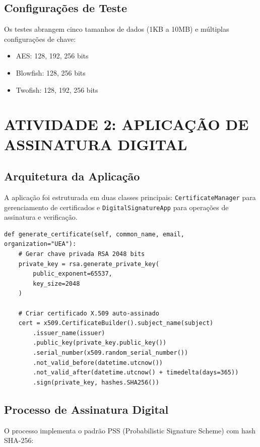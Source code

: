 \documentclass[12pt,a4paper,oneside]{article}
\begin{document}
\subsection{Configurações de Teste}

Os testes abrangem cinco tamanhos de dados (1KB a 10MB) e múltiplas configurações de chave:
\begin{itemize}
    \item AES: 128, 192, 256 bits
    \item Blowfish: 128, 256 bits
    \item Twofish: 128, 192, 256 bits
\end{itemize}

\section{ATIVIDADE 2: APLICAÇÃO DE ASSINATURA DIGITAL}

\subsection{Arquitetura da Aplicação}

A aplicação foi estruturada em duas classes principais: \texttt{CertificateManager} para gerenciamento de certificados e \texttt{DigitalSignatureApp} para operações de assinatura e verificação.

\begin{lstlisting}[caption=Geração de certificados ad-hoc]
def generate_certificate(self, common_name, email, organization="UEA"):
    # Gerar chave privada RSA 2048 bits
    private_key = rsa.generate_private_key(
        public_exponent=65537,
        key_size=2048
    )
    
    # Criar certificado X.509 auto-assinado
    cert = x509.CertificateBuilder().subject_name(subject)
        .issuer_name(issuer)
        .public_key(private_key.public_key())
        .serial_number(x509.random_serial_number())
        .not_valid_before(datetime.utcnow())
        .not_valid_after(datetime.utcnow() + timedelta(days=365))
        .sign(private_key, hashes.SHA256())
\end{lstlisting}

\subsection{Processo de Assinatura Digital}

O processo implementa o padrão PSS (Probabilistic Signature Scheme) com hash SHA-256:
\end{document}
